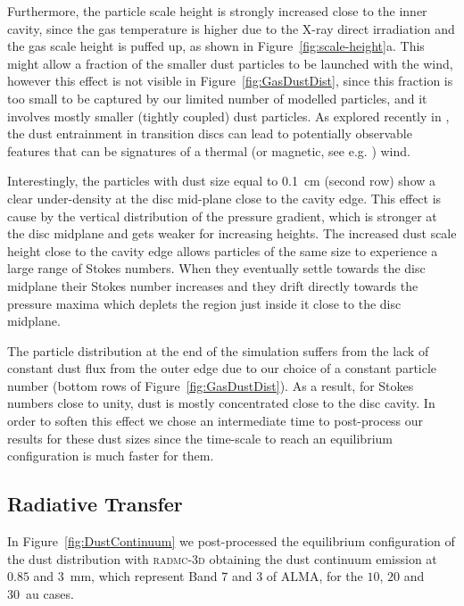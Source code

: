 \documentclass[fleqn,usenatbib]{mnras}
\begin{document}
        Furthermore, the particle scale height is strongly increased close to the inner cavity, since the gas temperature is higher due to the X-ray direct irradiation and the gas scale height is puffed up, as shown in Figure~\ref{fig:scale-height}a. This might allow a fraction of the smaller dust particles to be launched with the wind, however this effect is not visible in Figure~\ref{fig:GasDustDist}, since this fraction is too small to be captured by our limited number of modelled particles, and it involves mostly smaller (tightly coupled) dust particles. As explored recently in \citet{Franz2022}, the dust entrainment in transition discs can lead to potentially observable features that can be signatures of a thermal (or magnetic, see e.g. \citet{Rodenkirch2022}) wind.

        Interestingly, the particles with dust size equal to \SI{0.1}{cm} (second row) show a clear under-density at the disc mid-plane close to the cavity edge. This effect is cause by the vertical distribution of the pressure gradient, which is stronger at the disc midplane and gets weaker for increasing heights. The increased dust scale height close to the cavity edge allows particles of the same size to experience a large range of Stokes numbers. When they eventually settle towards the disc midplane their Stokes number increases and they drift directly towards the pressure maxima which deplets the region just inside it close to the disc midplane.
        
        The particle distribution at the end of the simulation suffers from the lack of constant dust flux from the outer edge due to our choice of a constant particle number (bottom rows of Figure~\ref{fig:GasDustDist}). As a result, for Stokes numbers close to unity, dust is mostly concentrated close to the disc cavity. In order to soften this effect we chose an intermediate time to post-process our results for these dust sizes since the time-scale to reach an equilibrium configuration is much faster for them.
  
    \subsection{Radiative Transfer} \label{sec:radiative-transfer}
        In Figure~\ref{fig:DustContinuum} we post-processed the equilibrium configuration of the dust distribution with \textsc{radmc-3d} obtaining the dust continuum emission at $0.85$ and \SI{3}{mm}, which represent Band 7 and 3 of ALMA, for the $10$, $20$ and \SI{30}{au} cases.
        
\end{document}
